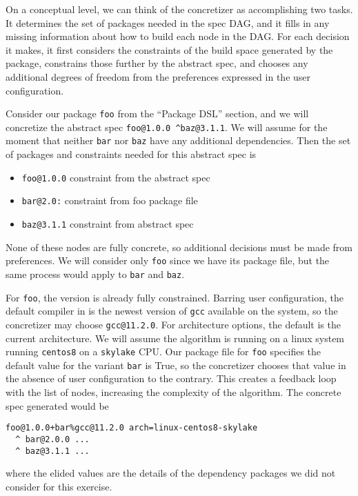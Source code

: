 On a conceptual level, we can think of the concretizer as accomplishing two tasks.
It determines the set of packages needed in the spec DAG, and it fills in any missing information about how to build each node in the DAG.
For each decision it makes, it first considers the constraints of the build space generated by the package, constrains those further by the abstract spec, and chooses any additional degrees of freedom from the preferences expressed in the user configuration.

Consider our package \texttt{foo} from the  ``Package DSL'' section, and we will concretize the abstract spec \texttt{foo@1.0.0 ^baz@3.1.1}.
We will assume for the moment that neither \texttt{bar} nor \texttt{baz} have any additional dependencies.
Then the set of packages and constraints needed for this abstract spec is

\begin{itemize}
\item \texttt{foo@1.0.0} constraint from the abstract spec \\
\item \texttt{bar@2.0:} constraint from foo package file \\
\item \texttt{baz@3.1.1} constraint from abstract spec \\
\end{itemize}

None of these nodes are fully concrete, so additional decisions must be made from preferences.
We will consider only \texttt{foo} since we have its package file, but the same process would apply to \texttt{bar} and \texttt{baz}.

For \texttt{foo}, the version is already fully constrained.
Barring user configuration, the default compiler in \spack is the newest version of \texttt{gcc} available on the system, so the concretizer may choose \texttt{gcc@11.2.0}.
For architecture options, the default is the current architecture. We will assume the algorithm is running on a linux system running \texttt{centos8} on a \texttt{skylake} CPU.
Our package file for \texttt{foo} specifies the default value for the variant \texttt{bar} is True, so the concretizer chooses that value in the absence of user configuration to the contrary.
This creates a feedback loop with the list of nodes, increasing the complexity of the algorithm.
The concrete spec generated would be

\begin{verbatim}
foo@1.0.0+bar%gcc@11.2.0 arch=linux-centos8-skylake
  ^ bar@2.0.0 ...
  ^ baz@3.1.1 ...
\end{verbatim}

where the elided values are the details of the dependency packages we did not consider for this exercise.
